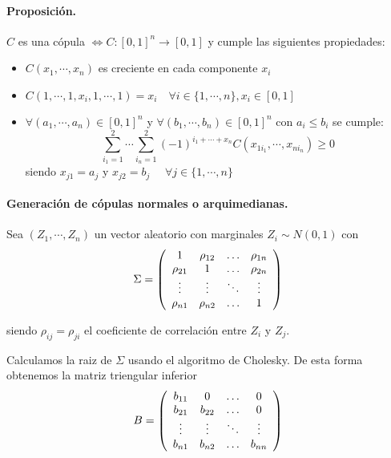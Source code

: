\paragraph{Proposici\'on.}
$C$ es una c\'opula $\iff C:[0,1]^n \to [0,1]$ y cumple las siguientes 
propiedades:
\begin{itemize}
\item $C(x_1, \cdots, x_n)$ es creciente en cada componente $x_i$
\item $C(1, \cdots, 1, x_i, 1, \cdots, 1) = x_i \quad \forall i \in \{1, \cdots, n\}, x_i \in [0,1]$
\item $\forall (a_1, \cdots, a_n) \in [0,1]^n$ y $\forall (b_1, \cdots, b_n) \in [0,1]^n$ con
$a_i \leq b_i$ se cumple:
\begin{displaymath}
\sum_{i_1=1}^{2} \cdots \sum_{i_n=1}^{2} (-1)^{i_1+\cdots+x_n} C(x_{1i_1},\cdots,x_{ni_n}) \geq 0
\end{displaymath}
\noindent siendo $x_{j1}=a_j$ y $x_{j2}=b_j$ $\quad \forall j \in \{1, \cdots, n\}$
\end{itemize}

\paragraph{Generaci\'on de c\'opulas normales o arquimedianas.}

Sea $(Z_1,\cdots, Z_n)$ un vector aleatorio con marginales $Z_i \sim N(0,1)$ con
\begin{displaymath}
\Sigma = \left( 
\begin{array}{cccc}
1          & \rho_{12} & \ldots & \rho_{1n} \cr
\rho_{21} & 1          & \ldots & \rho_{2n} \cr
\vdots    & \vdots    & \ddots & \vdots   \cr
\rho_{n1} & \rho_{n2} & \ldots & 1
\end{array}
\right)
\end{displaymath}

\noindent siendo $\rho_{ij} = \rho_{ji}$ el coeficiente de correlaci\'on entre 
$Z_i$ y $Z_j$.

\noindent Calculamos la raiz de $\Sigma$ usando el algoritmo de Cholesky. 
De esta forma obtenemos la matriz triengular inferior
\begin{displaymath}
B = 
\left(
\begin{array}{cccc}
b_{11}   & 0        & \ldots & 0       \cr
b_{21}   & b_{22}   & \ldots & 0       \cr
\vdots  & \vdots  & \ddots & \vdots \cr
b_{n1}   & b_{n2}   & \ldots & b_{nn}
\end{array}
\right)
\end{displaymath}

